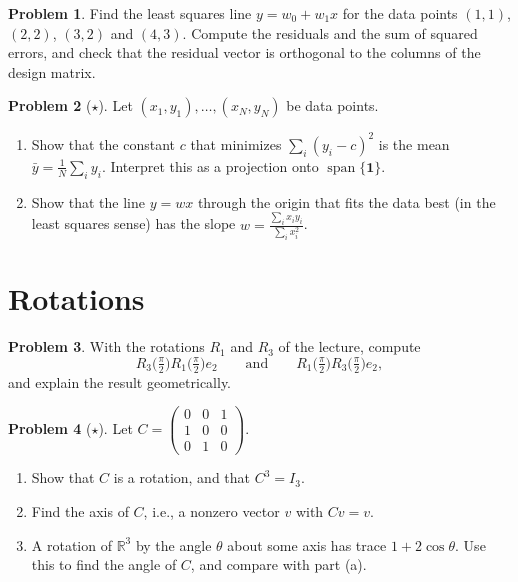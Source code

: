 \documentclass[11pt]{article}
\theoremstyle{definition}
\newtheorem{problem}{Problem}[section]
\DeclareMathOperator{\Span}{span}
\begin{document}
\begin{problem}\label{pr:least-squares}
    Find the least squares line $y = w_0 + w_1 x$ for the data points $(1, 1)$, $(2, 2)$, $(3, 2)$ and $(4, 3)$. Compute the residuals and the sum of squared errors, and check that the residual vector is orthogonal to the columns of the design matrix.
\end{problem}

\begin{problem}[$\star$]\label{pr:ls-special}
    Let $(x_1, y_1), \ldots, (x_N, y_N)$ be data points.
    \begin{enumerate}[label=(\alph*)]
        \item Show that the constant $c$ that minimizes $\sum_i (y_i - c)^2$ is the mean $\bar{y} = \frac{1}{N}\sum_i y_i$. Interpret this as a projection onto $\Span\{\mathbf{1}\}$.
        \item Show that the line $y = wx$ through the origin that fits the data best (in the least squares sense) has the slope $w = \frac{\sum_i x_i y_i}{\sum_i x_i^2}$.
    \end{enumerate}
\end{problem}

\section{Rotations}

\begin{problem}\label{pr:rot-noncomm}
    With the rotations $R_1$ and $R_3$ of the lecture, compute
    \[R_3\big(\tfrac{\pi}{2}\big) R_1\big(\tfrac{\pi}{2}\big) e_2 \qquad \text{and} \qquad R_1\big(\tfrac{\pi}{2}\big) R_3\big(\tfrac{\pi}{2}\big) e_2,\]
    and explain the result geometrically.
\end{problem}

\begin{problem}[$\star$]\label{pr:rot-axis}
    Let $C = \begin{pmatrix} 0 & 0 & 1 \\ 1 & 0 & 0 \\ 0 & 1 & 0 \end{pmatrix}$.
    \begin{enumerate}[label=(\alph*)]
        \item Show that $C$ is a rotation, and that $C^3 = I_3$.
        \item Find the axis of $C$, i.e., a nonzero vector $v$ with $Cv = v$.
        \item A rotation of $\mathbb{R}^3$ by the angle $\theta$ about some axis has trace $1 + 2\cos\theta$. Use this to find the angle of $C$, and compare with part (a).
    \end{enumerate}
\end{problem}
\end{document}
